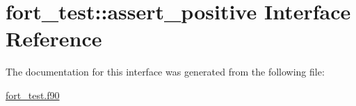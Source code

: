 \hypertarget{interfacefort__test_1_1assert__positive}{}\section{fort\+\_\+test\+:\+:assert\+\_\+positive Interface Reference}
\label{interfacefort__test_1_1assert__positive}


The documentation for this interface was generated from the following file\+:\begin{DoxyCompactItemize}
\item 
\hyperlink{fort__test_8f90}{fort\+\_\+test.\+f90}\end{DoxyCompactItemize}
